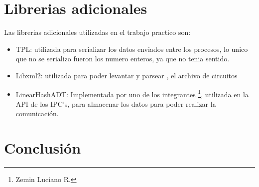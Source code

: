 \documentclass[10pt,a4paper]{article}
\begin{document}
\section{Librerias adicionales}
Las librerias adicionales utilizadas en el trabajo practico son:
\begin{itemize}
\item TPL: utilizada para serializar los datos enviados entre los procesos, lo unico que no se serializo fueron los numero enteros, ya que no tenia sentido.
\item Libxml2: utilizada para poder levantar y parsear , el archivo de circuitos 
\item LinearHashADT: Implementada por uno de los integrantes \footnote{Zemin Luciano R.}, utilizada en la API de los  IPC's, para almacenar los datos para poder realizar la comunicaci\'on.
\end{itemize}
\section{Conclusi\'on}
\end{document}
